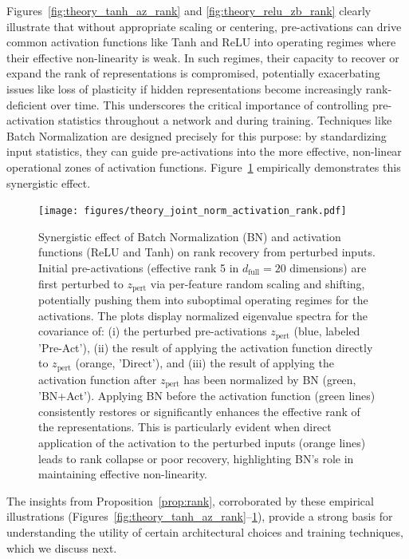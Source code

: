 \documentclass{article}
\begin{document}
Figures~\ref{fig:theory_tanh_az_rank} and \ref{fig:theory_relu_zb_rank} clearly illustrate that without appropriate scaling or centering, pre-activations can drive common activation functions like Tanh and ReLU into operating regimes where their effective non-linearity is weak. In such regimes, their capacity to recover or expand the rank of representations is compromised, potentially exacerbating issues like loss of plasticity if hidden representations become increasingly rank-deficient over time. This underscores the critical importance of controlling pre-activation statistics throughout a network and during training. Techniques like Batch Normalization are designed precisely for this purpose: by standardizing input statistics, they can guide pre-activations into the more effective, non-linear operational zones of activation functions. Figure~\ref{fig:theory_joint_norm_activation_rank} empirically demonstrates this synergistic effect.

\begin{figure}[ht!]
    \centering
    \texttt{[image: figures/theory\_joint\_norm\_activation\_rank.pdf]} 
    \caption{Synergistic effect of Batch Normalization (BN) and activation functions (ReLU and Tanh) on rank recovery from perturbed inputs. Initial pre-activations (effective rank 5 in $d_{\text{full}}=20$ dimensions) are first perturbed to $z_{\text{pert}}$ via per-feature random scaling and shifting, potentially pushing them into suboptimal operating regimes for the activations. The plots display normalized eigenvalue spectra for the covariance of: (i) the perturbed pre-activations $z_{\text{pert}}$ (blue, labeled 'Pre-Act'), (ii) the result of applying the activation function directly to $z_{\text{pert}}$ (orange, 'Direct'), and (iii) the result of applying the activation function after $z_{\text{pert}}$ has been normalized by BN (green, 'BN+Act'). Applying BN before the activation function (green lines) consistently restores or significantly enhances the effective rank of the representations. This is particularly evident when direct application of the activation to the perturbed inputs (orange lines) leads to rank collapse or poor recovery, highlighting BN's role in maintaining effective non-linearity.}
    \label{fig:theory_joint_norm_activation_rank}
\end{figure}

The insights from Proposition~\ref{prop:rank}, corroborated by these empirical illustrations (Figures~\ref{fig:theory_tanh_az_rank}--\ref{fig:theory_joint_norm_activation_rank}), provide a strong basis for understanding the utility of certain architectural choices and training techniques, which we discuss next.
\end{document}
